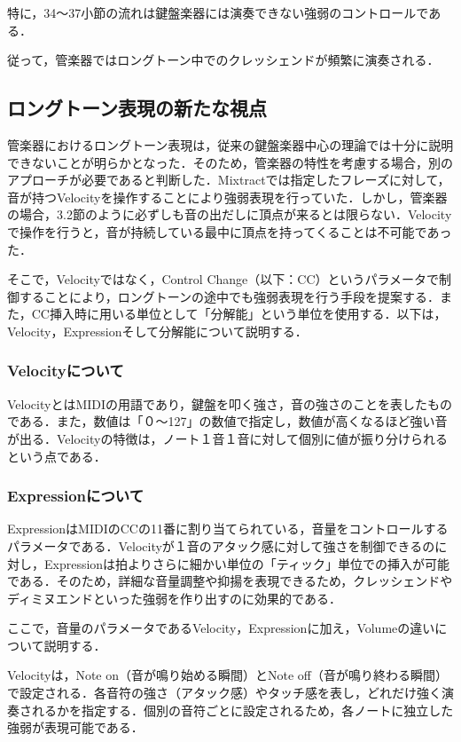 特に，34～37小節の流れは鍵盤楽器には演奏できない強弱のコントロールである．

従って，管楽器ではロングトーン中でのクレッシェンドが頻繁に演奏される．



\subsection{ロングトーン表現の新たな視点}
管楽器におけるロングトーン表現は，従来の鍵盤楽器中心の理論では十分に説明できないことが明らかとなった．そのため，管楽器の特性を考慮する場合，別のアプローチが必要であると判断した．Mixtractでは指定したフレーズに対して，音が持つVelocityを操作することにより強弱表現を行っていた．しかし，管楽器の場合，3.2節のように必ずしも音の出だしに頂点が来るとは限らない．Velocityで操作を行うと，音が持続している最中に頂点を持ってくることは不可能であった．

そこで，Velocityではなく，Control Change（以下：CC）というパラメータで制御することにより，ロングトーンの途中でも強弱表現を行う手段を提案する．また，CC挿入時に用いる単位として「分解能」\cite{Tick}という単位を使用する．以下は，Velocity，Expressionそして分解能について説明する．
\subsubsection{Velocityについて}
VelocityとはMIDIの用語であり，鍵盤を叩く強さ，音の強さのことを表したものである．また，数値は「０～127」の数値で指定し，数値が高くなるほど強い音が出る．Velocityの特徴は，ノート１音１音に対して個別に値が振り分けられるという点である．
\subsubsection{Expressionについて}
ExpressionはMIDIのCCの11番に割り当てられている，音量をコントロールするパラメータである．Velocityが１音のアタック感に対して強さを制御できるのに対し，Expressionは拍よりさらに細かい単位の「ティック」単位での挿入が可能である．そのため，詳細な音量調整や抑揚を表現できるため，クレッシェンドやディミヌエンドといった強弱を作り出すのに効果的である．

ここで，音量のパラメータであるVelocity，Expressionに加え，Volumeの違いについて説明する．

Velocityは，Note on（音が鳴り始める瞬間）とNote off（音が鳴り終わる瞬間）で設定される．各音符の強さ（アタック感）やタッチ感を表し，どれだけ強く演奏されるかを指定する．個別の音符ごとに設定されるため，各ノートに独立した強弱が表現可能である．

